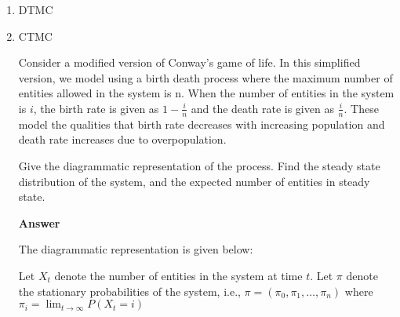 \documentclass[12pt, oneside]{article}
\begin{document}
\begin{enumerate}
\item DTMC

\item {
    CTMC

    Consider a  modified version of Conway's game of life. In this simplified version,
    we model using a birth death process where the maximum number of entities allowed in
    the system is n. When the number of entities in the system is \(i\), the birth rate is
    given as \(1 - \frac{i}{n}\) and the death rate is given as \(\frac{i}{n}\). These
    model the qualities that birth rate decreases with increasing population and death
    rate increases due to overpopulation.

    Give the diagrammatic representation of the process. Find the steady state distribution
    of the system, and the expected number of entities in steady state.

    \textbf{Answer}

    The diagrammatic representation is given below:


    Let \(X_t\) denote the number of entities in the system at time \(t\).
    Let \(\pi\) denote the stationary probabilities of the system, i.e.,
    \(\pi = (\pi_0, \pi_1, \ldots, \pi_n)\) where \(\pi_i = \lim_{t \to \infty} P(X_t = i)\)

}
\end{enumerate}
\end{document}
